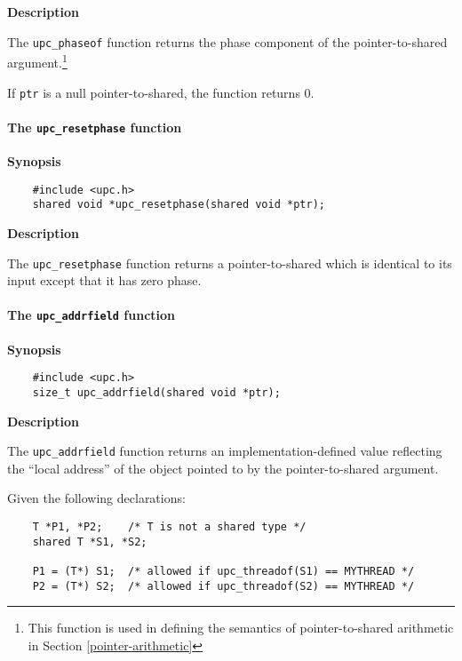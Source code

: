 {\bf Description}

\np The {\tt upc\_phaseof} function returns the phase component of the
    pointer-to-shared argument.\footnote{%
   This function is used in defining the semantics of pointer-to-shared
   arithmetic in Section \ref{pointer-arithmetic}}

    
\np If {\tt ptr} is a null pointer-to-shared, the function returns 0.

\paragraph{The {\tt upc\_resetphase} function}

{\bf Synopsis} 

\npf\vspace{-2.5em}
\begin{verbatim}
    #include <upc.h> 
    shared void *upc_resetphase(shared void *ptr); 
\end{verbatim}

{\bf Description}

\np The {\tt upc\_resetphase} function returns a pointer-to-shared
    which is identical to its input except that it has zero phase. 

\paragraph{The {\tt upc\_addrfield} function}
\label{upc_addrfield}

{\bf Synopsis} 

\npf\vspace{-2.5em}

\begin{verbatim}
    #include <upc.h> 
    size_t upc_addrfield(shared void *ptr); 
\end{verbatim}

{\bf Description}

\np The {\tt upc\_addrfield} function returns an
   implementation-defined value reflecting the ``local address'' of the
   object pointed to by the pointer-to-shared argument.

\np Given the following declarations:

\begin{verbatim}
    T *P1, *P2;    /* T is not a shared type */
    shared T *S1, *S2;  

    P1 = (T*) S1;  /* allowed if upc_threadof(S1) == MYTHREAD */ 
    P2 = (T*) S2;  /* allowed if upc_threadof(S2) == MYTHREAD */ 
\end{verbatim}

